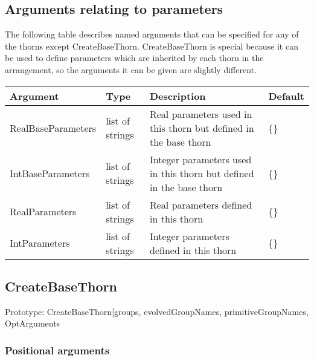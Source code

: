 \documentclass{report}
\newcommand{\tablewidth}{\textwidth}
\begin{document}
\subsection{Arguments relating to parameters}
\label{app:parameter_arguments}

The following table describes named arguments that can be specified
for any of the thorns except CreateBaseThorn.  CreateBaseThorn is
special because it can be used to define parameters which are
inherited by each thorn in the arrangement, so the arguments it can be
given are slightly different.

\begin{center}
\begin{tabularx}{\tablewidth}{|l|l|X|l|}
  \hline
  \bf Argument & \bf Type & \bf Description & \bf Default\\
  \hline
  RealBaseParameters & list of strings & Real parameters used in this thorn but 
                                         defined in the base thorn & \{\}\\
  IntBaseParameters & list of strings & Integer parameters used in this thorn 
                                        but defined in the base thorn & \{\}\\
  RealParameters & list of strings & Real parameters defined in this thorn & \{\}\\
  IntParameters & list of strings & Integer parameters defined in this thorn & \{\}\\
  \hline
\end{tabularx}
\end{center}



\subsection{CreateBaseThorn}
\label{app:CreateBaseThorn}

Prototype: CreateBaseThorn[groups, evolvedGroupNames, primitiveGroupNames, 
OptArguments

\subsubsection{Positional arguments}
\end{document}

